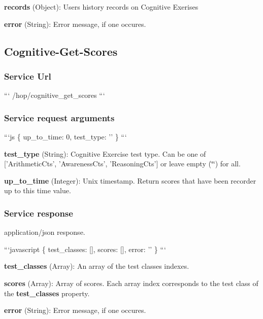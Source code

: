 \begin{DoxyItemize}
\item {\bfseries records} (Object)\-: Users history records on Cognitive Exerises
\item {\bfseries error} (String)\-: Error message, if one occures.
\end{DoxyItemize}

\subsection*{Cognitive-\/\-Get-\/\-Scores}

\subsubsection*{Service Url}

``` /hop/cognitive\-\_\-get\-\_\-scores ```

\subsubsection*{Service request arguments}

```js \{ up\-\_\-to\-\_\-time\-: 0, test\-\_\-type\-: '' \} ```


\begin{DoxyItemize}
\item {\bfseries test\-\_\-type} (String)\-: Cognitive Exercise test type. Can be one of \mbox{[}'Arithmetic\-Cts', 'Awareness\-Cts', 'Reasoning\-Cts'\mbox{]} or leave empty (\char`\"{}\char`\"{}) for all.
\item {\bfseries up\-\_\-to\-\_\-time} (Integer)\-: Unix timestamp. Return scores that have been recorder up to this time value.
\end{DoxyItemize}

\subsubsection*{Service response}

application/json response.

```javascript \{ test\-\_\-classes\-: \mbox{[}\mbox{]}, scores\-: \mbox{[}\mbox{]}, error\-: '' \} ```


\begin{DoxyItemize}
\item {\bfseries test\-\_\-classes} (Array)\-: An array of the test classes indexes.
\item {\bfseries scores} (Array)\-: Array of scores. Each array index corresponds to the test class of the {\bfseries test\-\_\-classes} property.
\item {\bfseries error} (String)\-: Error message, if one occures. 
\end{DoxyItemize}